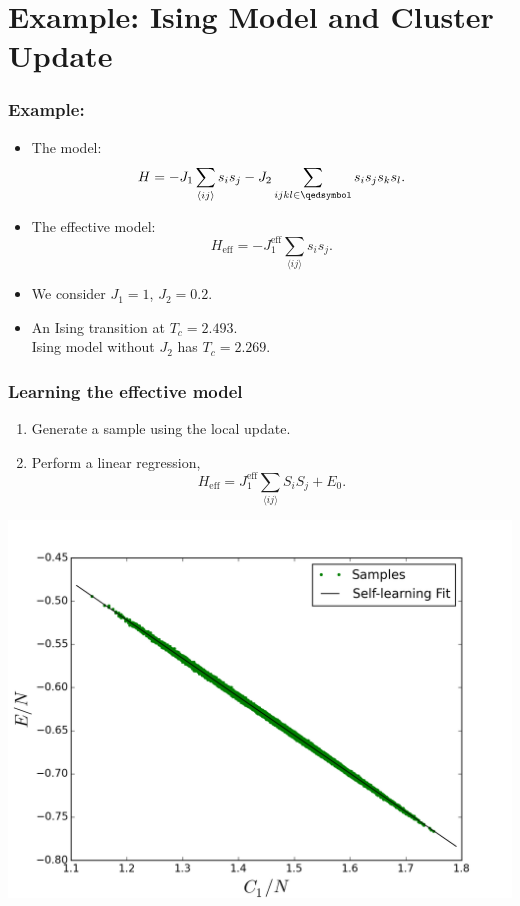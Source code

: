 \documentclass[xcolor=table, 10pt, aspectratio=169]{beamer}
\begin{document}
\section{Example: Ising Model and Cluster Update}

\begin{frame}
  \frametitle{Example:}
  \begin{itemize}
    \item The model:
    \[H= - J_1 \sum_{\langle ij\rangle} s_i s_j - J_2 \sum_{ijkl \in \qedsymbol } s_i s_j s_k s_l.\]
    \item The effective model:
    \[H_{\text{eff}} = -J_1^{\text{eff}}\sum_{\langle ij\rangle} s_i s_j.\]
    \item We consider $J_1=1$, $J_2=0.2$.
    \item An Ising transition at $T_c=2.493$.\\
    {\small Ising model without $J_2$ has $T_c=2.269$.}
  \end{itemize}
\end{frame}

\begin{frame}
  \frametitle{Learning the effective model}
    \begin{enumerate}
      \item Generate a sample using the local update.
      \item Perform a linear regression,
      \[  H_{\text{eff}} = J_1^{\text{eff}}\sum_{\langle ij\rangle}S_iS_j+E_0.\]
    \end{enumerate}
    \centering
    \includegraphics[width=.5\columnwidth]{dist_fit.png}
\end{frame}

\end{document}
